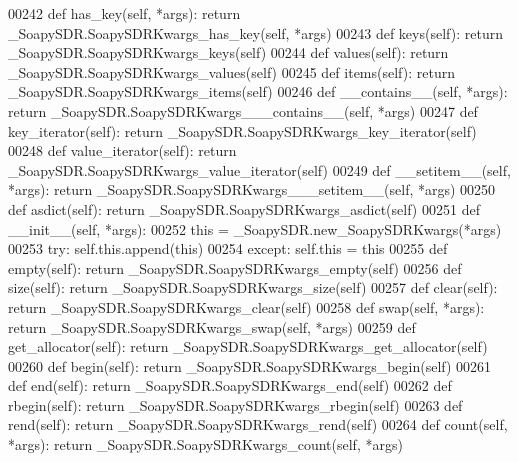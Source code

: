\begin{DoxyCode}
{{{00242     \textcolor{keyword}{def }has_key(self, *args): \textcolor{keywordflow}{return} \_SoapySDR.SoapySDRKwargs\_has\_key(self, *args)
00243     \textcolor{keyword}{def }keys(self): \textcolor{keywordflow}{return} \_SoapySDR.SoapySDRKwargs\_keys(self)
00244     \textcolor{keyword}{def }values(self): \textcolor{keywordflow}{return} \_SoapySDR.SoapySDRKwargs\_values(self)
00245     \textcolor{keyword}{def }items(self): \textcolor{keywordflow}{return} \_SoapySDR.SoapySDRKwargs\_items(self)
00246     \textcolor{keyword}{def }__contains__(self, *args): \textcolor{keywordflow}{return} \_SoapySDR.SoapySDRKwargs\_\_\_contains\_\_(self, *args)
00247     \textcolor{keyword}{def }key_iterator(self): \textcolor{keywordflow}{return} \_SoapySDR.SoapySDRKwargs\_key\_iterator(self)
00248     \textcolor{keyword}{def }value_iterator(self): \textcolor{keywordflow}{return} \_SoapySDR.SoapySDRKwargs\_value\_iterator(self)
00249     \textcolor{keyword}{def }__setitem__(self, *args): \textcolor{keywordflow}{return} \_SoapySDR.SoapySDRKwargs\_\_\_setitem\_\_(self, *args)
00250     \textcolor{keyword}{def }asdict(self): \textcolor{keywordflow}{return} \_SoapySDR.SoapySDRKwargs\_asdict(self)
00251     \textcolor{keyword}{def }__init__(self, *args): 
00252         this = \_SoapySDR.new\_SoapySDRKwargs(*args)
00253         \textcolor{keywordflow}{try}: self.this.append(this)
00254         \textcolor{keywordflow}{except}: self.this = this
00255     \textcolor{keyword}{def }empty(self): \textcolor{keywordflow}{return} \_SoapySDR.SoapySDRKwargs\_empty(self)
00256     \textcolor{keyword}{def }size(self): \textcolor{keywordflow}{return} \_SoapySDR.SoapySDRKwargs\_size(self)
00257     \textcolor{keyword}{def }clear(self): \textcolor{keywordflow}{return} \_SoapySDR.SoapySDRKwargs_clear(self)
00258     \textcolor{keyword}{def }swap(self, *args): \textcolor{keywordflow}{return} \_SoapySDR.SoapySDRKwargs\_swap(self, *args)
00259     \textcolor{keyword}{def }get_allocator(self): \textcolor{keywordflow}{return} \_SoapySDR.SoapySDRKwargs\_get\_allocator(self)
00260     \textcolor{keyword}{def }begin(self): \textcolor{keywordflow}{return} \_SoapySDR.SoapySDRKwargs\_begin(self)
00261     \textcolor{keyword}{def }end(self): \textcolor{keywordflow}{return} \_SoapySDR.SoapySDRKwargs\_end(self)
00262     \textcolor{keyword}{def }rbegin(self): \textcolor{keywordflow}{return} \_SoapySDR.SoapySDRKwargs\_rbegin(self)
00263     \textcolor{keyword}{def }rend(self): \textcolor{keywordflow}{return} \_SoapySDR.SoapySDRKwargs\_rend(self)
00264     \textcolor{keyword}{def }count(self, *args): \textcolor{keywordflow}{return} \_SoapySDR.SoapySDRKwargs\_count(self, *args)
}}}
\end{DoxyCode}
